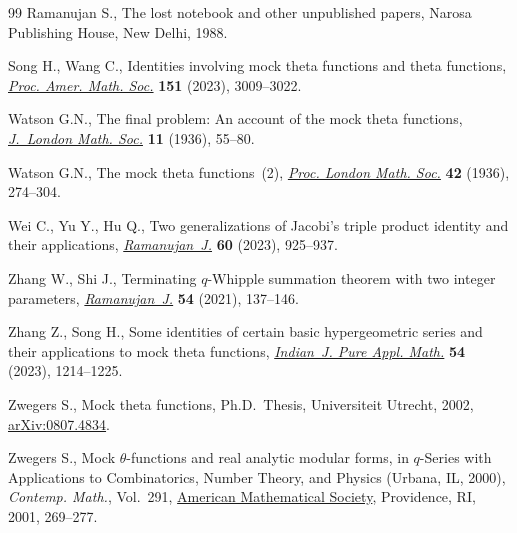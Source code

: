 \documentclass[10pt,a4paper]{amsart}
\numberwithin{equation}{section}
\begin{document}
\begin{thebibliography}{99}
Ramanujan S., The lost notebook and other unpublished papers, Narosa Publishing
  House, New Delhi, 1988.

Song H., Wang C., Identities involving mock theta functions and theta
  functions, \href{https://doi.org/10.1090/proc/16343}{\textit{Proc. Amer.
  Math. Soc.}} \textbf{151} (2023), 3009--3022.

Watson G.N., The final problem: {A}n account of the mock theta functions,
  \href{https://doi.org/10.1112/jlms/s1-11.1.55}{\textit{J.~London Math. Soc.}}
  \textbf{11} (1936), 55--80.

Watson G.N., The mock theta functions~(2),
  \href{https://doi.org/10.1112/plms/s2-42.1.274}{\textit{Proc. London Math.
  Soc.}} \textbf{42} (1936), 274--304.

Wei C., Yu Y., Hu Q., Two generalizations of {J}acobi's triple product identity
  and their applications,
  \href{https://doi.org/10.1007/s11139-022-00640-x}{\textit{Ramanujan~J.}}
  \textbf{60} (2023), 925--937.

Zhang W., Shi J., Terminating {$q$}-{W}hipple summation theorem with two
  integer parameters,
  \href{https://doi.org/10.1007/s11139-019-00208-2}{\textit{Ramanujan~J.}}
  \textbf{54} (2021), 137--146.

Zhang Z., Song H., Some identities of certain basic hypergeometric series and
  their applications to mock theta functions,
  \href{https://doi.org/10.1007/s13226-022-00335-5}{\textit{Indian~J. Pure
  Appl. Math.}} \textbf{54} (2023), 1214--1225.

Zwegers S., Mock theta functions, Ph.D.~Thesis, {U}niversiteit Utrecht, 2002,
  \href{http://arxiv.org/abs/0807.4834}{arXiv:0807.4834}.

Zwegers S., Mock {$\theta$}-functions and real analytic modular forms, in
  {$q$}-{S}eries with {A}pplications to {C}ombinatorics, {N}umber {T}heory, and
  {P}hysics ({U}rbana, {IL}, 2000), \textit{Contemp. Math.}, Vol.~291,
  \href{https://doi.org/10.1090/conm/291/04907}{American Mathematical Society},
  Providence, RI, 2001, 269--277.

\end{thebibliography}
\end{document}
